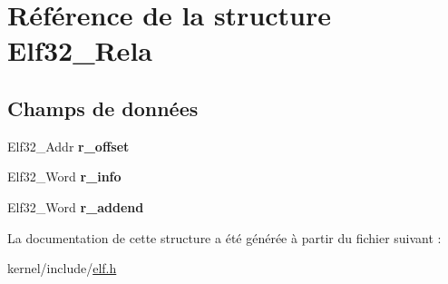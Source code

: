 \hypertarget{structElf32__Rela}{\section{Référence de la structure Elf32\-\_\-\-Rela}
\label{structElf32__Rela}
}
\subsection*{Champs de données}
\begin{DoxyCompactItemize}
\item 
\hypertarget{structElf32__Rela_aa850a306ee7fa3935a9f8c3d1aae4e51}{Elf32\-\_\-\-Addr {\bfseries r\-\_\-offset}}\label{structElf32__Rela_aa850a306ee7fa3935a9f8c3d1aae4e51}

\item 
\hypertarget{structElf32__Rela_ac3a79d3f04209c33ddb4c36d07e68a79}{Elf32\-\_\-\-Word {\bfseries r\-\_\-info}}\label{structElf32__Rela_ac3a79d3f04209c33ddb4c36d07e68a79}

\item 
\hypertarget{structElf32__Rela_ad6d06a60c911de065e4a65194d1c899a}{Elf32\-\_\-\-Word {\bfseries r\-\_\-addend}}\label{structElf32__Rela_ad6d06a60c911de065e4a65194d1c899a}

\end{DoxyCompactItemize}


La documentation de cette structure a été générée à partir du fichier suivant \-:\begin{DoxyCompactItemize}
\item 
kernel/include/\hyperlink{elf_8h}{elf.\-h}\end{DoxyCompactItemize}
